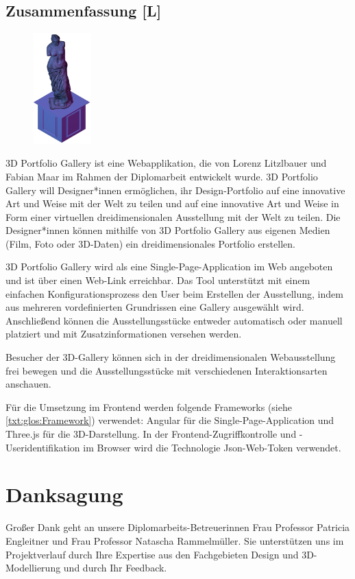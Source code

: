 \newpage
\begin{spacing}{1}
    \chapter*{Zusammenfassung [L]}
\end{spacing}
\begin{figure}
    \begin{center}
      \includegraphics[width=0.2\textwidth]{pics/statue.png}
    \end{center}
\end{figure}
3D Portfolio Gallery ist eine Webapplikation, die von Lorenz Litzlbauer und Fabian Maar im Rahmen der Diplomarbeit entwickelt wurde. 3D Portfolio Gallery will Designer*innen ermöglichen, ihr Design-Portfolio auf eine innovative Art und Weise mit der Welt zu teilen und auf eine innovative Art und Weise in Form einer virtuellen dreidimensionalen Ausstellung mit der Welt zu teilen. Die Designer*innen können mithilfe von 3D Portfolio Gallery aus eigenen Medien (Film, Foto oder 3D-Daten) ein dreidimensionales Portfolio erstellen.

3D Portfolio Gallery wird als eine Single-Page-Application im Web angeboten und ist über einen Web-Link erreichbar. Das Tool unterstützt mit einem einfachen Konfigurationsprozess den User beim Erstellen der Ausstellung, indem aus mehreren vordefinierten Grundrissen eine Gallery ausgewählt wird. Anschließend können die Ausstellungsstücke entweder automatisch oder manuell platziert und mit Zusatzinformationen versehen werden.

Besucher der 3D-Gallery können sich in der dreidimensionalen Webausstellung frei bewegen und die Ausstellungsstücke mit verschiedenen Interaktionsarten anschauen.

Für die Umsetzung im Frontend werden folgende Frameworks (siehe \ref{txt:glos:Framework}) verwendet: Angular für die Single-Page-Application und Three.js für die 3D-Darstellung. In der Frontend-Zugriffkontrolle und -Useridentifikation im Browser wird die Technologie Json-Web-Token verwendet.

\chapter*{Danksagung}
Großer Dank geht an unsere Diplomarbeits-Betreuerinnen
Frau Professor Patricia Engleitner und Frau Professor Natascha Rammelmüller. Sie unterstützen uns im Projektverlauf durch Ihre Expertise aus den Fachgebieten Design und 3D-Modellierung und durch Ihr Feedback.
